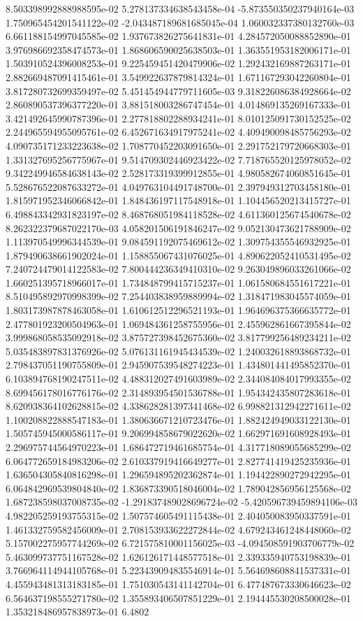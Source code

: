 8.503398992888988595e-02	5.278137334638543458e-04	-5.873550350237940164e-03	1.750965454201541122e-02	-2.043487189681685045e-04	1.060032337380132760e-03	6.661188154997045585e-02	1.937673826275641831e-01	4.284572050088852890e-01	3.976986692358474573e-01	1.868606590025638503e-01	1.363551953182006171e-01	1.503910524396008253e-01	9.225459451420479906e-02	1.292432169887263171e-01	2.882669487091415461e-01	3.549922637879814324e-01	1.671167293042260804e-01	3.817280732699359497e-02	5.451454944779711605e-03	9.318226086384928664e-02	2.860890537396377220e-01	3.881518003286747454e-01	4.014869135269167333e-01	3.421492645990787396e-01	2.277818802288934241e-01	8.010125091730152525e-02	2.244965594955095761e-02	6.452671634917975241e-02	4.409490098485756293e-02	4.090735171233223638e-02	1.708770452203091650e-01	2.291752179720668303e-01	1.331327695256775967e-01	9.514709302446923422e-02	7.718765520125978052e-02	9.342249946584638143e-02	2.528173319399912855e-01	4.980582674060851645e-01	5.528676522087633272e-01	4.049763104491748700e-01	2.397949312703458180e-01	1.815971952346066842e-01	1.848436197117548918e-01	1.104456520213415727e-01	6.498843342931823197e-02	8.468768051984118528e-02	4.611360125674540678e-02	8.262322379687022170e-03	4.058201506191846247e-02	9.052130473621788909e-02	1.113970549996344539e-01	9.084591192075469612e-02	1.309754355546932925e-01	1.879490638661902024e-01	1.158855067431076025e-01	4.890622052410531495e-02	7.240724479014122583e-02	7.800444236349410310e-02	9.263049896033261066e-02	1.660251395718966017e-01	1.734848799415715237e-01	1.061580684551617221e-01	8.510495892970998399e-02	7.254403838959889994e-02	1.318471983045574059e-01	1.803173987878463058e-01	1.610612512296521193e-01	1.964696375366635772e-01	2.477801923200504963e-01	1.069484361258755956e-01	2.455962861667395844e-02	3.999868058535092918e-02	3.875727398452675360e-02	3.817799256489234211e-02	5.035483897831376926e-02	5.076131161945434539e-02	1.240032618893868732e-01	2.798437051190755809e-01	2.945907539548274223e-01	1.434801441495852370e-01	6.103894768190247511e-02	4.488312027491603989e-02	2.344084084017993355e-02	8.699456178016776176e-02	2.314893954501536788e-01	1.954342435807283618e-01	8.620938364102628815e-02	4.338628281397341468e-02	6.998821312942271611e-02	1.100208822888547183e-01	1.380636671210723476e-01	1.882424949033122130e-01	1.505745945000586117e-01	9.206994858679022620e-02	1.662971691608928493e-01	2.296975744564970223e-01	1.686472719461685754e-01	4.317718089055685299e-02	6.064772659184983206e-02	2.610337919416649277e-01	2.827741419425235936e-01	1.636504305840816298e-01	1.296594895202362874e-01	1.194422890272942295e-01	6.064842969539804840e-02	1.836873390518046004e-02	1.789042856956125568e-02	1.687238598037008735e-02	-1.291837489028696724e-02	-5.420596739459894106e-03	4.982205259193755315e-02	1.507574605491115438e-01	2.404050083950337591e-01	1.461332759582456009e-01	2.708153933622272844e-02	4.679243461248448060e-02	5.157002275957744269e-02	6.721575810001156025e-03	-4.094508591903706779e-02	5.463099737751167528e-02	1.626126171448577518e-01	2.339335940753198839e-01	3.766964114944105768e-01	5.223439094835546914e-01	5.564698608841537331e-01	4.455943481313183185e-01	1.751030543141142704e-01	6.477487673330646623e-02	6.564637198555271780e-02	1.355893406507851229e-01	2.194445530208500028e-01	1.353218486957838973e-01	6.4802